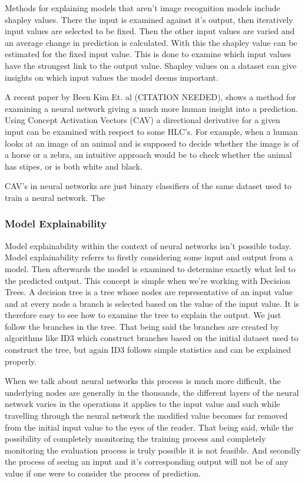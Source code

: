
Methods for explaining models that aren't image recognition models include
shapley values. There the input is examined against it's output, then iteratively
input values are selected to be fixed. Then the other input values are varied and
an average change in prediction is calculated. With this the shapley value can be
estimated for the fixed input value. This is done to examine which input values have
the strongest link to the output value. Shapley values on a dataset can give insights
on which input values the model deems important.


A recent paper by Been Kim Et. al (CITATION NEEDED), shows a method for examining
a neural network giving a much more human insight into a prediction. Using Concept
Activation Vectors (CAV) a directional derivative for a given input can be examined
with respect to some HLC's. For example, when a human looks at an image of an animal
and is supposed to decide whether the image is of a horse or a zebra, an intuitive
approach would be to check whether the animal has stipes, or is both white and black.

CAV's in neural networks are just binary classifiers of the same dataset used to train
a neural network. The 

\subsubsection{Model Explainability}

Model explainability within the context of neural networks isn't possible today. Model
explainability referrs to firstly considering some input and output from a model. Then
afterwards the model is examined to determine exactly what led to the predicted output.
This concept is simple when we're working with Decision Trees. A decision tree is a tree
whose nodes are representative of an input value and at every node a branch is selected
based on the value of the input value. It is therefore easy to see how to examine the tree
to explain the output. We just follow the branches in the tree. That being said the branches
are created by algorithms like ID3 which construct branches based on the initial dataset used
to construct the tree, but again ID3 follows simple statistics and can be explained properly.

When we talk about neural networks this process is much more difficult, the underlying nodes
are generally in the thousands, the different layers of the neural network varies in the operations
it applies to the input value and such while travelling through the neural network the modified
value becomes far removed from the initial input value to the eyes of the reader. That being said,
while the possibility of completely monitoring the training process and completely monitoring the
evaluation process is truly possible it is not feasible. And secondly the process of seeing an
input and it's corresponding output will not be of any value if one were to consider the process
of prediction.

